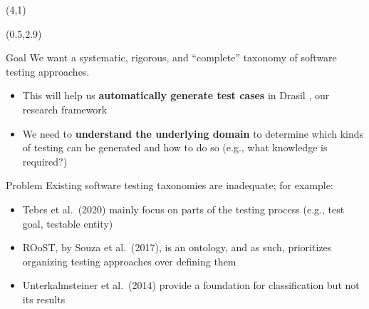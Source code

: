 \documentclass[22pt]{beamer}
\begin{document}
\begin{frame}[fragile]
    \begin{textblock}{8}(4,1)
        \titlepage
    \end{textblock}

    \begin{textblock}{7.25}(0.5,2.9)
        \begin{block}{\fontsize{37}{20}\selectfont Goal}
            We want a systematic, rigorous, and ``complete'' taxonomy of
            software testing approaches.
            \begin{itemize}
                \item This will help us \textbf{automatically generate test cases}
                      in Drasil \cite{carette_drasil_2021}, our research framework
                \item We need to \textbf{understand the underlying domain} to
                      determine which kinds of testing can be generated
                      and how to do so (e.g., what knowledge is required?)
            \end{itemize}

            \vspace{5mm}
        \end{block}

        \begin{block}{\fontsize{37}{20}\selectfont Problem}
            Existing software testing taxonomies are inadequate; for example:
            \begin{itemize}
                \item Tebes et al.~(2020) mainly focus on parts of the
                      testing process (e.g., test goal, testable entity)
                \item ROoST, by Souza et al.~(2017), is an ontology, and as
                      such, prioritizes organizing testing approaches over
                      defining them
                \item Unterkalmsteiner et al.~(2014) provide a foundation for
                      classification but not its results
            \end{itemize}
            \vspace{5mm}
        \end{block}


\end{textblock}
\end{frame}
\end{document}
